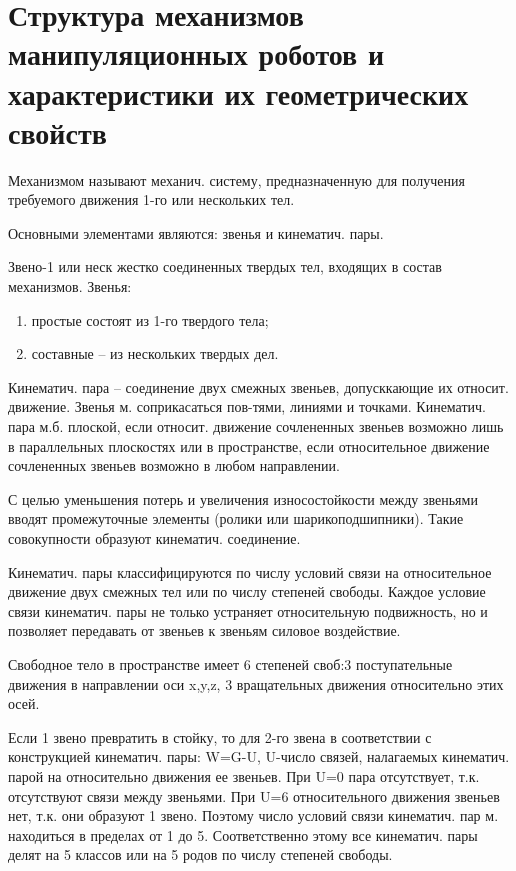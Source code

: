 \documentclass[unicode, 12pt, a4paper, oneside]{article}
\begin{document}
\section{Структура механизмов манипуляционных роботов и характеристики их геометрических свойств}

Механизмом называют механич. систему, предназначенную для получения требуемого движения 1-го или нескольких тел.

Основными элементами являются: звенья и кинематич. пары.

Звено-1 или неск жестко соединенных твердых тел, входящих в состав механизмов.
Звенья:
\begin{enumerate}
\item простые состоят из 1-го твердого тела;
\item составные – из нескольких твердых дел.
\end{enumerate}

Кинематич. пара – соединение двух смежных звеньев, допусккающие их относит. движение. Звенья м. соприкасаться пов-тями, линиями и точками.
Кинематич. пара м.б. плоской, если относит. движение сочлененных звеньев возможно лишь в параллельных плоскостях или в пространстве, если относительное движение сочлененных звеньев возможно в любом направлении.

С целью уменьшения потерь и увеличения износостойкости между звеньями вводят промежуточные элементы (ролики или шарикоподшипники). Такие совокупности образуют кинематич. соединение.

Кинематич. пары классифицируются по числу условий связи на относительное движение двух смежных тел или по числу степеней свободы. Каждое условие связи кинематич. пары не только устраняет относительную подвижность, но и позволяет передавать от звеньев к звеньям силовое воздействие.

Свободное тело в пространстве имеет 6 степеней своб:3 поступательные движения в направлении оси x,y,z, 3 вращательных движения относительно этих осей.

Если 1 звено превратить в стойку, то для 2-го звена в соответствии с конструкцией кинематич. пары: W=G-U, U-число связей, налагаемых кинематич. парой на относительно движения ее звеньев. При U=0 пара отсутствует, т.к. отсутствуют связи между звеньями. При U=6 относительного движения звеньев нет, т.к. они образуют 1 звено. Поэтому число условий связи кинематич. пар м. находиться в пределах от 1 до 5. Соответственно этому все кинематич. пары делят на 5 классов или на 5 родов по числу степеней свободы.
\end{document}
